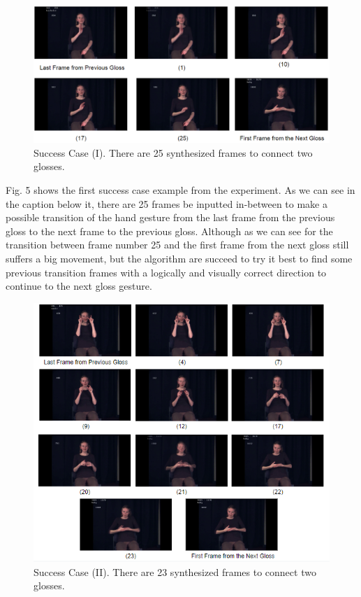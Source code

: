 \documentclass{sig-alternate-05-2015}
\begin{document}
\begin{figure}
	\centering
	\includegraphics[width=\linewidth]{img/success.png}
	\caption{Success Case (I). There are 25 synthesized frames to connect two glosses.}
\end{figure}

Fig. 5 shows the first success case example from the experiment. As we can see in the caption below it, there are 25 frames be inputted in-between to make a possible transition of the hand gesture from the last frame from the previous gloss to the next frame to the previous gloss. Although as we can see for the transition between frame number 25 and the first frame from the next gloss still suffers a big movement, but the algorithm are succeed to try it best to find some previous transition frames with a logically and visually correct direction to continue to the next gloss gesture.

\begin{figure}
	\centering
	\includegraphics[width=\linewidth]{img/success1.png}
	\caption{Success Case (II). There are 23 synthesized frames to connect two glosses.}
\end{figure}
\end{document}
